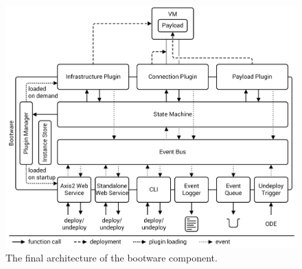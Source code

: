 \begin{figure}[!htbp]
	\centering
	\includegraphics[resolution=600]{design/assets/final_bootware_architecture}
	\caption{The final architecture of the bootware component.}
	\label{image:finalarch}
\end{figure}
